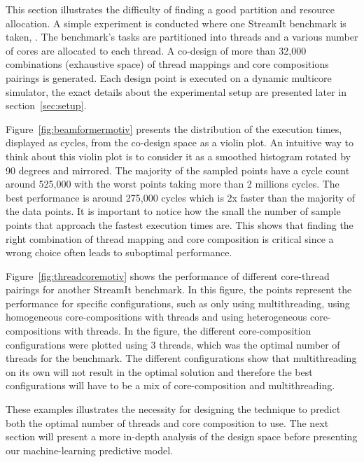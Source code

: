 This section illustrates the difficulty of finding a good partition and resource allocation.
A simple experiment is conducted where one StreamIt benchmark is taken, .
The benchmark's tasks are partitioned into threads and a various number of cores are allocated to each thread.
A co-design of more than 32,000 combinations (exhaustive space) of thread mappings and core compositions pairings is generated.
Each design point is executed on a dynamic multicore simulator, the exact details about the experimental setup are presented later in section~\ref{sec:setup}.

Figure~\ref{fig:beamformermotiv} presents the distribution of the execution times, displayed as cycles, from the co-design space as a violin plot.
An intuitive way to think about this violin plot is to consider it as a smoothed histogram rotated by 90 degrees and mirrored.
The majority of the sampled points have a cycle count around 525,000 with the worst points taking more than 2 millions cycles.
The best performance is around 275,000 cycles which is 2x faster than the majority of the data points.
It is important to notice how the small the number of sample points that approach the fastest execution times are.
This shows that finding the right combination of thread mapping and core composition is critical since a wrong choice often leads to suboptimal performance.

Figure~\ref{fig:threadcoremotiv} shows the performance of different core-thread pairings for another StreamIt benchmark.
In this figure, the points represent the performance for specific configurations, such as only using multithreading, using homogeneous core-compositions with threads and using heterogeneous core-compositions with threads.
In the figure, the different core-composition configurations were plotted using 3 threads, which was the optimal number of threads for the benchmark.
The different configurations show that multithreading on its own will not result in the optimal solution and therefore the best configurations will have to be a mix of core-composition and multithreading.

These examples illustrates the necessity for designing the technique to predict both the optimal number of threads and core composition to use.
The next section will present a more in-depth analysis of the design space before presenting our machine-learning predictive model.

